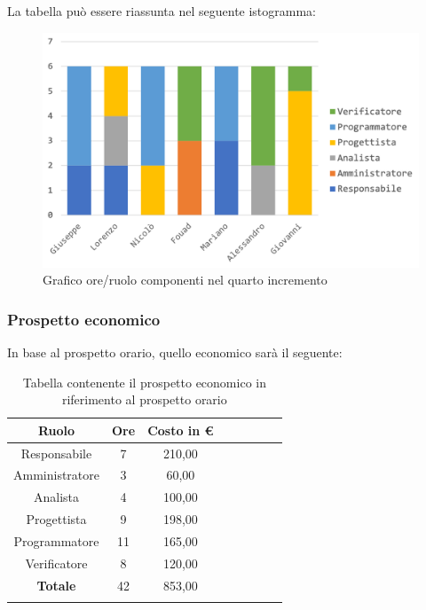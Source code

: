 		La tabella può essere riassunta nel seguente istogramma:
		\begin{figure}[H]
			\centering
			\includegraphics[width=0.8\linewidth]{./images/preventivo/incremento4-1.png}
			\caption{Grafico ore/ruolo componenti nel quarto  incremento}
			\label{fig:grafico suddivione ruoli incremento IV}
		\end{figure}
		
		\subsubsection{Prospetto economico}
		In base al prospetto orario, quello economico sarà il seguente: 
		
		\begin{longtable}{|c|c|c|c|c|c|c|c|}
			\hline
			\rowcolor{lighter-grayer}
			\textbf{Ruolo} & \textbf{Ore} & \textbf{Costo in € } \\
			\hline
			\endfirsthead
			
			\hline
			Responsabile 	    & 7 & 210,00\\
			\hline 
			\hline
			Amministratore	   & 3 & 60,00\\
			\hline
			\hline
			Analista 				& 4 & 100,00\\
			\hline
			\hline
			Progettista 		   & 9 & 198,00\\
			\hline
			\hline
			Programmatore 	  & 11 & 165,00\\
			\hline
			\hline
			Verificatore 		   & 8 & 120,00\\
			\hline
			\textbf{Totale} 	 & 42 & 853,00\\
			\hline
			\caption{Tabella contenente il prospetto economico in riferimento al prospetto orario}
		\end{longtable}
		\pagebreak
		
